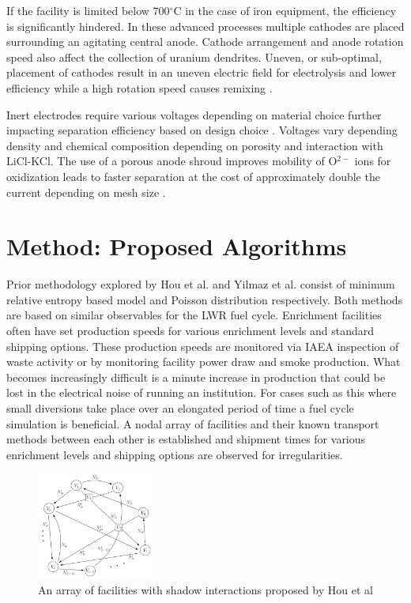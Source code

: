 \documentclass{anstrans}
\begin{document}
If the facility is limited below 700$^{\circ}$C in the case of iron equipment, the efficiency is significantly hindered. In these advanced processes multiple cathodes are placed surrounding an agitating central anode. Cathode arrangement and anode rotation speed also affect the collection of uranium dendrites. Uneven, or sub-optimal, placement of cathodes result in an uneven electric field for electrolysis and lower efficiency while a high rotation speed causes remixing \cite{lee_advanced_nodate}.

Inert electrodes require various voltages depending on material choice further impacting separation efficiency based on design choice \cite{koyama_development_2012}. Voltages vary depending density and chemical composition depending on porosity and interaction with LiCl-KCl. The use of a porous anode shroud improves mobility of O$^{2-}$ ions for oxidization leads to faster separation at the cost of approximately double the current depending on mesh size \cite{choi_electrochemical_2015}. 
\section{Method: Proposed Algorithms}
Prior methodology explored by Hou et al. and Yilmaz et al. \cite{Hou_2016,Yilmaz_2016} consist of minimum relative entropy based model and Poisson distribution respectively. Both methods are based on similar observables for the LWR fuel cycle. Enrichment facilities often have set production speeds for various enrichment levels and standard shipping options. These production speeds are monitored via IAEA inspection of waste activity or by monitoring facility power draw and smoke production. What becomes increasingly difficult is a minute increase in production that could be lost in the electrical noise of running an institution. For cases such as this where small diversions take place over an elongated period of time a fuel cycle simulation is beneficial. A nodal array of facilities and their known transport methods between each other is established and shipment times for various enrichment levels and shipping options are observed for irregularities. 

\begin{figure}[ht] %
	\centering
	\includegraphics[width=0.35\textwidth]{Hou_Network}
	\caption{An array of facilities with shadow interactions proposed by Hou et al\cite{Hou_2016}}
	\label{fig:maximumlikelihood}
\end{figure}
\end{document}
